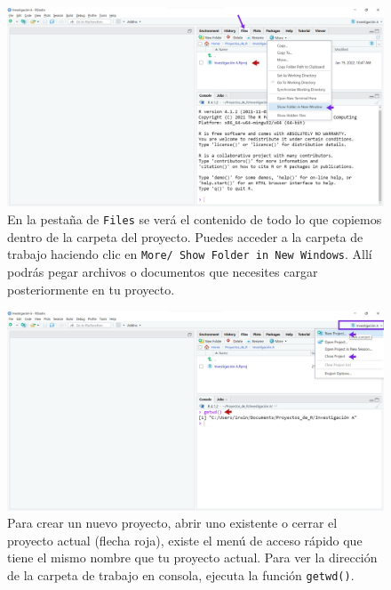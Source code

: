 \documentclass[
]{article}
\theoremstyle{definition}
\theoremstyle{definition}
\theoremstyle{definition}
\theoremstyle{definition}
\theoremstyle{remark}
\begin{document}
\begin{figure}

{\centering \includegraphics[width=1\linewidth]{figs/screenshots/proyectos5} 

}

\caption{En la pestaña de \texttt{Files} se verá el contenido de todo lo que copiemos dentro de la carpeta del proyecto. Puedes acceder a la carpeta de trabajo haciendo clic en \texttt{More/\ Show\ Folder\ in\ New\ Windows}. Allí podrás pegar archivos o documentos que necesites cargar posteriormente en tu proyecto.}\label{fig:figura34}
\end{figure}



\begin{figure}

{\centering \includegraphics[width=1\linewidth]{figs/screenshots/proyectos6} 

}

\caption{Para crear un nuevo proyecto, abrir uno existente o cerrar el proyecto actual (flecha roja), existe el menú de acceso rápido que tiene el mismo nombre que tu proyecto actual. Para ver la dirección de la carpeta de trabajo en consola, ejecuta la función \texttt{getwd()}.}\label{fig:figura35}
\end{figure}
\end{document}
